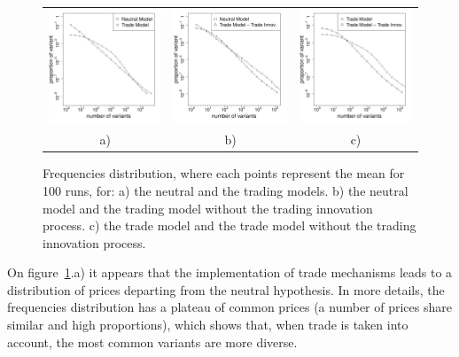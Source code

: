 \documentclass[a4paper]{article}
\begin{document}
\begin{figure}[!h]
	\begin{center}
		\begin{tabular}{ccc}
		\includegraphics[width=5.2cm]{img/2SetupDistribA.pdf} &
		\includegraphics[width=5.2cm]{img/2SetupDistribB.pdf} &
		\includegraphics[width=5.2cm]{img/2SetupDistribD.pdf} \\
		a) & b) & c)  \\
		\end{tabular}

	\end{center}
	\caption{Frequencies distribution, where each points represent the mean for 100 runs, for: a) the neutral and the trading models.  b) the neutral model and the trading model without the trading innovation process. c) the trade model and the trade model without the trading innovation process.}
	\label{fig:2setDi}
\end{figure}

On figure~\ref{fig:2setDi}.a) it appears that the implementation of trade mechanisms leads to a distribution of prices departing from the neutral hypothesis. In more details, the frequencies distribution has a plateau of common prices (a number of prices share similar and high proportions), which shows that, when trade is taken into account, the most common variants are more diverse. 
\end{document}
